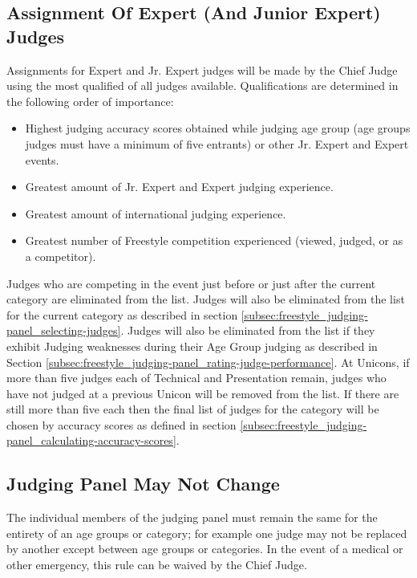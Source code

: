 \subsection{Assignment Of Expert (And Junior Expert) Judges \label{subsec:freestyle_judging-panel_assignment-of-expert-judges}}
Assignments for Expert and Jr. Expert judges will be made by the Chief Judge using the most qualified of all judges available.
Qualifications are determined in the following order of importance:
\begin{itemize}
\item Highest judging accuracy scores obtained while judging age group (age groups judges must have a minimum of five entrants) or other Jr. Expert and Expert events.
\item Greatest amount of Jr. Expert and Expert judging experience.
\item Greatest amount of international judging experience.
\item Greatest number of Freestyle competition experienced (viewed, judged, or as a competitor).
\end{itemize}
Judges who are competing in the event just before or just after the current category are eliminated from the list.
Judges will also be eliminated from the list for the current category as described in section \ref{subsec:freestyle_judging-panel_selecting-judges}.
Judges will also be eliminated from the list if they exhibit Judging weaknesses during their Age Group judging as described in Section \ref{subsec:freestyle_judging-panel_rating-judge-performance}.
At Unicons, if more than five judges each of Technical and Presentation remain, judges who have not judged at a previous Unicon will be removed from the list.
If there are still more than five each then the final list of judges for the category will be chosen by accuracy scores as defined in section \ref{subsec:freestyle_judging-panel_calculating-accuracy-scores}.

\subsection{Judging Panel May Not Change}
The individual members of the judging panel must remain the same for the entirety of an age groups or category; for example one judge may not be replaced by another except between age groups or categories.
In the event of a medical or other emergency, this rule can be waived by the Chief Judge.

